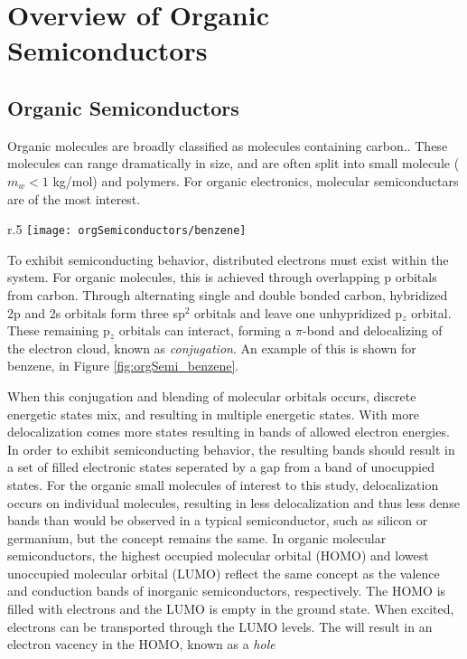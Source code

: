 \documentclass[../thesis.tex]{subfiles}
\begin{document}
\chapter{Overview of Organic Semiconductors}

\section{Organic Semiconductors}

Organic molecules are broadly classified as molecules containing carbon.\cite{Pope1999}.
These molecules can range dramatically in size, and are often split into small molecule ($m_w<1$ kg/mol) and polymers.
For organic electronics, molecular semiconductars are of the most interest.

\begin{wrapfigure}{r}{.5\textwidth}
\centering
\texttt{[image: orgSemiconductors/benzene]}
\caption{Molecular orbitals of benzene.  The left figure shows the 6 out of plain p$_z$ orbitals, and the right image shows the delocalized $\pi$-bond. \url{https://upload.wikimedia.org/wikipedia/commons/thumb/9/90/Benzene_Orbitals.svg/750px-Benzene_Orbitals.svg.png}}
\label{fig:orgSemi_benzene}
\end{wrapfigure}

To exhibit semiconducting behavior, distributed electrons must exist within the system.\supercite{Neamen1992}
For organic molecules, this is achieved through overlapping p orbitals from carbon.  
Through alternating single and double bonded carbon, hybridized 2p and 2s orbitals form three sp$^2$ orbitals and leave one unhypridized p$_z$ orbital.
These remaining p$_z$ orbitals can interact, forming a $\pi$-bond and delocalizing of the electron cloud, known as \textit{conjugation}.
An example of this is shown for benzene, in Figure \ref{fig:orgSemi_benzene}.

When this conjugation and blending of molecular orbitals occurs, discrete energetic states mix, and resulting in multiple energetic states.\supercite{Kittel2005,Wallis2000}
With more delocalization comes more states resulting in bands of allowed electron energies.
In order to exhibit semiconducting behavior, the resulting bands should result in a set of filled electronic states seperated by a gap from a band of unocuppied states.
For the organic small molecules of interest to this study, delocalization occurs on individual molecules, resulting in less delocalization and thus less dense bands than would be observed in a typical semiconductor, such as silicon or germanium, but the concept remains the same.
In organic molecular semiconductors, the highest occupied molecular orbital (HOMO) and lowest unoccupied molecular orbital (LUMO) reflect the same concept as the valence and conduction bands of inorganic semiconductors, respectively.
The HOMO is filled with electrons and the LUMO is empty in the ground state.
When excited, electrons can be transported through the LUMO levels.
The will result in an electron vacency in the HOMO, known as a \textit{hole}
\end{document}
